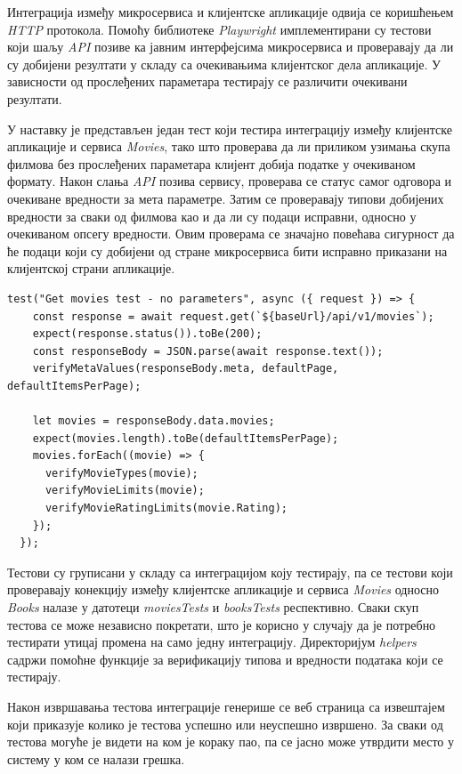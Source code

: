 \documentclass[12pt,oneside]{memoir}
\begin{document}
Интеграција између микросервиса и клијентске апликације одвија се коришћењем \textit{HTTP} протокола. Помоћу библиотеке \textit{Playwright} имплементирани су тестови који шаљу \textit{API} позиве ка јавним интерфејсима микросервиса и проверавају да ли су добијени резултати у складу са очекивањима клијентског дела апликације. У зависности од прослеђених параметара тестирају се различити очекивани резултати.

У наставку је представљен један тест који тестира интеграцију између клијентске апликације и сервиса \textit{Movies}, тако што проверава да ли приликом узимања скупа филмова без прослеђених параметара клијент добија податке у очекиваном формату. Након слања \textit{API} позива сервису, проверава се статус самог одговора и очекиване вредности за мета параметре. Затим се проверавају типови добијених вредности за сваки од филмова као и да ли су подаци исправни, односно у очекиваном опсегу вредности. Овим проверама се значајно повећава сигурност да ће подаци који су добијени од стране микросервиса бити исправно приказани на клијентској страни апликације.

\begin{lstlisting}[caption= Тест интеграције сервиса \textit{Movies} и клијентске апликације, 
basicstyle=\tiny,
label={lst:integrationTest},
frame=single]
test("Get movies test - no parameters", async ({ request }) => {
    const response = await request.get(`${baseUrl}/api/v1/movies`);
    expect(response.status()).toBe(200);
    const responseBody = JSON.parse(await response.text());
    verifyMetaValues(responseBody.meta, defaultPage, defaultItemsPerPage);

    let movies = responseBody.data.movies;
    expect(movies.length).toBe(defaultItemsPerPage);
    movies.forEach((movie) => {
      verifyMovieTypes(movie);
      verifyMovieLimits(movie);
      verifyMovieRatingLimits(movie.Rating);
    });
  });
\end{lstlisting}

Тестови су груписани у складу са интеграцијом коју тестирају, па се тестови који проверавају конекцију између клијентске апликације и сервиса \textit{Movies} односно \textit{Books} налазе у датотеци \textit{moviesTests} и \textit{booksTests} респективно. Сваки скуп тестова се може независно покретати, што је корисно у случају да је потребно тестирати утицај промена на само једну интеграцију. Директоријум \textit{helpers} садржи помоћне функције за верификацију типова и вредности података који се тестирају.

Након извршавања тестова интеграције генерише се веб страница са извештајем који приказује колико је тестова успешно или неуспешно извршено. За сваки од тестова могуће је видети на ком је кораку пао, па се јасно може утврдити место у систему у ком се налази грешка.
\end{document}
